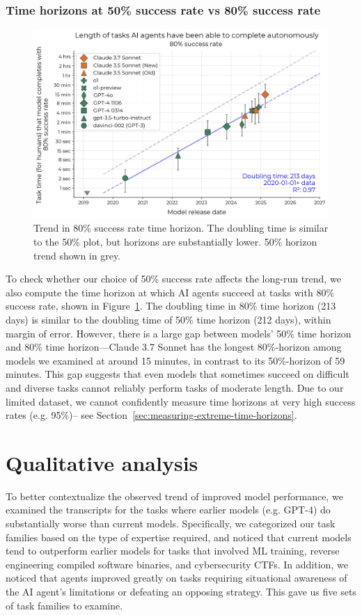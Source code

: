 \documentclass{article}
\begin{document}
\subsubsection{Time horizons at 50\% success rate vs 80\% success rate} \label{sec:p80}

\begin{figure}
    \centering
    \includegraphics[width=0.8\linewidth]{plots/logistic/p80.png}
    \caption{Trend in 80\% success rate time horizon. The doubling time is similar to the 50\% plot, but horizons are substantially lower. 50\% horizon trend shown in grey.}
    \label{fig:p80}
\end{figure}

To check whether our choice of 50\% success rate affects the long-run trend, we also compute the time horizon at which AI agents succeed at tasks with 80\% success rate, shown in Figure~\ref{fig:p80}. The doubling time in 80\% time horizon (213 days) is similar to the doubling time of 50\% time horizon (212 days), within margin of error. However, there is a large gap between models' 50\% time horizon and 80\% time horizon---Claude 3.7 Sonnet has the longest 80\%-horizon among models we examined at around 15 minutes, in contrast to its 50\%-horizon of 59 minutes. This gap suggests that even models that sometimes succeed on difficult and diverse tasks cannot reliably perform tasks of moderate length. Due to our limited dataset, we cannot confidently measure time horizons at very high success rates (e.g. 95\%)-- see Section~\ref{sec:measuring-extreme-time-horizons}.


\section{Qualitative analysis} \label{sec:qualitative-analysis}

To better contextualize the observed trend of improved model performance, we examined the transcripts for the tasks where earlier models (e.g. GPT-4) do substantially worse than current models. 
Specifically, we categorized our task families based on the type of expertise required, and noticed that current models tend to outperform earlier models for tasks that involved ML training, reverse engineering compiled software binaries, and cybersecurity CTFs. 
In addition, we noticed that agents improved greatly on tasks requiring situational awareness of the AI agent's limitations or defeating an opposing strategy. 
This gave us five sets of task families to examine.
\end{document}
